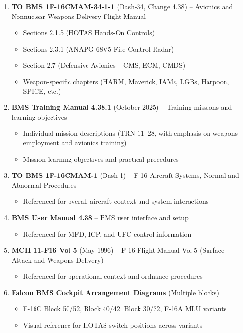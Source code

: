 \documentclass[11pt,a4paper]{article}
\begin{document}
\begin{enumerate}

\item \textbf{TO BMS 1F-16CMAM-34-1-1} (Dash-34, Change 4.38) -- Avionics and Nonnuclear Weapons Delivery Flight Manual

\begin{itemize}
\item Sections 2.1.5 (HOTAS Hands-On Controls)
\item Sections 2.3.1 (AN\-APG-68V5 Fire Control Radar)
\item Section 2.7 (Defensive Avionics -- CMS, ECM, CMDS)
\item Weapon-specific chapters (HARM, Maverick, IAMs, LGBs, Harpoon, SPICE, etc.)
\end{itemize}

\item \textbf{BMS Training Manual 4.38.1} (October 2025) -- Training missions and learning objectives

\begin{itemize}
\item Individual mission descriptions (TRN 11--28, with emphasis on weapons employment and avionics training)
\item Mission learning objectives and practical procedures
\end{itemize}

\item \textbf{TO BMS 1F-16CMAM-1} (Dash-1) -- F-16 Aircraft Systems, Normal and Abnormal Procedures

\begin{itemize}
\item Referenced for overall aircraft context and system interactions
\end{itemize}

\item \textbf{BMS User Manual 4.38} -- BMS user interface and setup

\begin{itemize}
\item Referenced for MFD, ICP, and UFC control information
\end{itemize}

\item \textbf{MCH 11-F16 Vol 5} (May 1996) -- F-16 Flight Manual Vol 5 (Surface Attack and Weapons Delivery)

\begin{itemize}
\item Referenced for operational context and ordnance procedures
\end{itemize}

\item \textbf{Falcon BMS Cockpit Arrangement Diagrams} (Multiple blocks)

\begin{itemize}
\item F-16C Block 50/52, Block 40/42, Block 30/32, F-16A MLU variants
\item Visual reference for HOTAS switch positions across variants
\end{itemize}

\end{enumerate}
\end{document}
